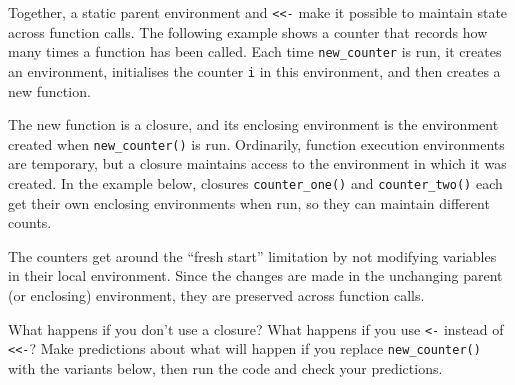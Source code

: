 Together, a static parent environment and
\texttt{\textless{}\textless{}-} make it possible to maintain state
across function calls. The following example shows a counter that
records how many times a function has been called. Each time
\texttt{new\_counter} is run, it creates an environment, initialises the
counter \texttt{i} in this environment, and then creates a new function.

\begin{Shaded}
\begin{Highlighting}[]
\StringTok{ }
  \StringTok{ }
    \StringTok{ }\StringTok{ }
  \NormalTok{\}}
\NormalTok{\}}
\end{Highlighting}
\end{Shaded}

The new function is a closure, and its enclosing environment is the
environment created when \texttt{new\_counter()} is run. Ordinarily,
function execution environments are temporary, but a closure maintains
access to the environment in which it was created. In the example below,
closures \texttt{counter\_one()} and \texttt{counter\_two()} each get
their own enclosing environments when run, so they can maintain
different counts.

\begin{Shaded}
\begin{Highlighting}[]
\StringTok{ }\NormalTok{()}
\StringTok{ }\NormalTok{()}

\NormalTok{()}
\NormalTok{()}
\NormalTok{()}
\end{Highlighting}
\end{Shaded}

The counters get around the ``fresh start'' limitation by not modifying
variables in their local environment. Since the changes are made in the
unchanging parent (or enclosing) environment, they are preserved across
function calls.

What happens if you don't use a closure? What happens if you use
\texttt{\textless{}-} instead of \texttt{\textless{}\textless{}-}? Make
predictions about what will happen if you replace
\texttt{new\_counter()} with the variants below, then run the code and
check your predictions.

